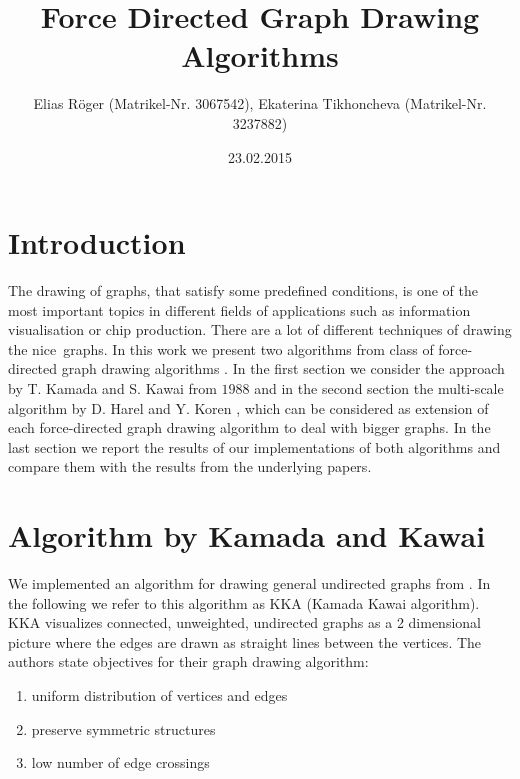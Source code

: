\documentclass[12pt,a4paper]{article}
\author{Elias Röger (Matrikel-Nr. 3067542), Ekaterina Tikhoncheva (Matrikel-Nr. 3237882)}
\title{Force Directed Graph Drawing Algorithms}
\date{23.02.2015}
\begin{document}
\maketitle

\section{Introduction}

The drawing of graphs, that satisfy some predefined conditions, is one of the most important topics in different fields of applications such as information visualisation or chip production. There are a lot of different techniques of drawing the \glqq nice\grqq\ graphs. In this work we present two algorithms from class of force-directed graph drawing algorithms \cite{Kobouro}. In the first section we consider the approach by T. Kamada and S. Kawai \cite{TomihisaKamada1989} from $1988$ and in the second section the multi-scale algorithm by D. Harel and Y. Koren \cite{DavidHarel2002}, which can be considered as extension of each force-directed graph drawing algorithm to deal with bigger graphs. In the last section we report the results of our implementations of both algorithms and compare them with the results from the underlying papers.


\section{Algorithm by Kamada and Kawai}
\label{section1}

We implemented an algorithm for drawing general undirected graphs from \cite{TomihisaKamada1989}. In the following we refer to this algorithm as KKA (Kamada Kawai algorithm). \\ KKA visualizes connected, unweighted, undirected graphs as a 2 dimensional picture where the edges are drawn as straight lines between the vertices. The authors state objectives for their graph drawing algorithm:
\begin{enumerate}
	\item uniform distribution of vertices and edges
	\item preserve symmetric structures
	\item low number of edge crossings
\end{enumerate}
\end{document}
